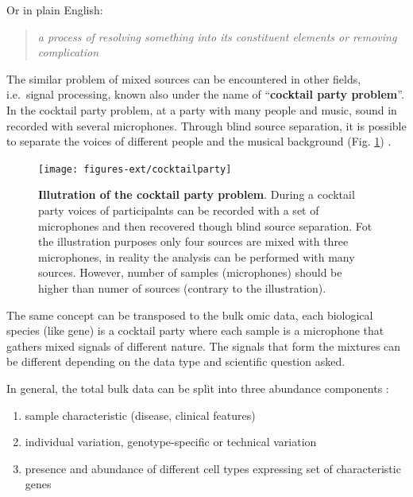 \documentclass[12pt,]{book}
\providecommand{\tightlist}{%
  \setlength{\itemsep}{0pt}\setlength{\parskip}{0pt}}
\theoremstyle{definition}
\theoremstyle{definition}
\theoremstyle{definition}
\theoremstyle{remark}
\begin{document}
Or in plain English:

\begin{quote}
\emph{a process of resolving something into its constituent elements or
removing complication}
\end{quote}

The similar problem of mixed sources can be encountered in other fields,
i.e.~signal processing, known also under the name of ``\textbf{cocktail
party problem}''. In the cocktail party problem, at a party with many
people and music, sound in recorded with several microphones. Through
blind source separation, it is possible to separate the voices of
different people and the musical background (Fig.
\ref{fig:cocktailparty}) \citep{Cherry1953}.

\begin{figure}

{\centering \texttt{[image: figures-ext/cocktailparty]} 

}

\caption[illutration of the cocktail party problem]{\textbf{Illutration of the cocktail party
problem}. During a cocktail party voices of participalnts can be
recorded with a set of microphones and then recovered though blind
source separation. Fot the illustration purposes only four sources are
mixed with three microphones, in reality the analysis can be performed
with many sources. However, number of samples (microphones) should be
higher than numer of sources (contrary to the illustration).}\label{fig:cocktailparty}
\end{figure}









The same concept can be transposed to the bulk omic data, each
biological species (like gene) is a cocktail party where each sample is
a microphone that gathers mixed signals of different nature. The signals
that form the mixtures can be different depending on the data type and
scientific question asked.

In general, the total bulk data can be split into three abundance
components \citep{Shen-Orr2013}:

\begin{enumerate}
\def\labelenumi{\arabic{enumi}.}
\tightlist
\item
  sample characteristic (disease, clinical features)
\item
  individual variation, genotype-specific or technical variation
\item
  presence and abundance of different cell types expressing set of
  characteristic genes
\end{enumerate}
\end{document}
